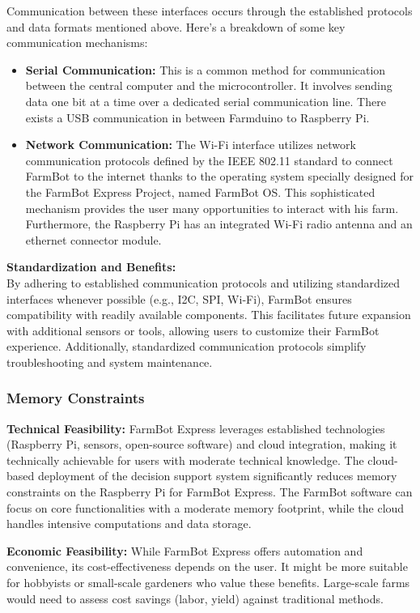 Communication between these interfaces occurs through the established protocols and data formats mentioned above. Here's a breakdown of some key communication mechanisms:
\begin{itemize}
    \item \textbf{Serial Communication:} This is a common method for communication between the central computer and the microcontroller. It involves sending data one bit at a time over a dedicated serial communication line. There exists a USB communication in between Farmduino to Raspberry Pi.
    \item \textbf{Network Communication:} The Wi-Fi interface utilizes network communication protocols defined by the IEEE 802.11 standard to connect FarmBot to the internet thanks to the operating system specially designed for the FarmBot Express Project, named FarmBot OS. This sophisticated mechanism provides the user many opportunities to interact with his farm. Furthermore, the Raspberry Pi has an integrated Wi-Fi radio antenna and an ethernet connector module. 
\end{itemize}

\textbf{Standardization and Benefits:}\\
By adhering to established communication protocols and utilizing standardized interfaces whenever possible (e.g., I2C, SPI, Wi-Fi), FarmBot ensures compatibility with readily available components. This facilitates future expansion with additional sensors or tools, allowing users to customize their FarmBot experience. Additionally, standardized communication protocols simplify troubleshooting and system maintenance.
\subsubsection{Memory Constraints}
\textbf{Technical Feasibility:} FarmBot Express leverages established technologies (Raspberry Pi, sensors, open-source software) and cloud integration, making it technically achievable for users with moderate technical knowledge. The cloud-based deployment of the decision support system significantly reduces memory constraints on the Raspberry Pi for FarmBot Express. The FarmBot software can focus on core functionalities with a moderate memory footprint, while the cloud handles intensive computations and data storage.

\textbf{Economic Feasibility:} While FarmBot Express offers automation and convenience, its cost-effectiveness depends on the user. It might be more suitable for hobbyists or small-scale gardeners who value these benefits.  Large-scale farms would need to assess cost savings (labor, yield) against traditional methods.

